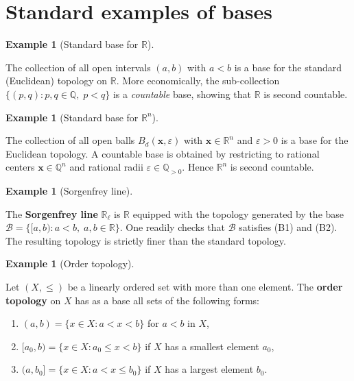 \documentclass[11pt,a4paper,twoside]{book}
\theoremstyle{remark}
\theoremstyle{definition}
\newtheorem{exampleplain}[theorem]{Example}
\theoremstyle{definition}
\newenvironment{example}[1][]{%
  \begin{exampleplain}[#1]\itshape
}{%
  \end{exampleplain}
}
\begin{document}
\section{Standard examples of bases}
\label{sec:base-examples}

\begin{example}[Standard base for $\mathbb{R}$]
\label{ex:base-R}
The collection of all open intervals $(a,b)$ with $a<b$ is a base for the
standard (Euclidean) topology on $\mathbb{R}$.  More economically, the
sub-collection $\{(p,q) : p,q\in\mathbb{Q},\;p<q\}$ is a \emph{countable}
base, showing that $\mathbb{R}$ is second countable.
\end{example}

\begin{example}[Standard base for $\mathbb{R}^n$]
\label{ex:base-Rn}
The collection of all open balls $B_d(\mathbf{x},\varepsilon)$ with
$\mathbf{x}\in\mathbb{R}^n$ and $\varepsilon>0$ is a base for the Euclidean
topology.  A countable base is obtained by restricting to rational centers
$\mathbf{x}\in\mathbb{Q}^n$ and rational radii $\varepsilon\in\mathbb{Q}_{>0}$.
Hence $\mathbb{R}^n$ is second countable.
\end{example}

\begin{example}[Sorgenfrey line]
\label{ex:sorgenfrey-base}
The \textbf{Sorgenfrey line} $\mathbb{R}_\ell$ is $\mathbb{R}$ equipped with
the topology generated by the base
$\mathscr{B}=\{[a,b) : a<b,\;a,b\in\mathbb{R}\}$.  One readily checks that
$\mathscr{B}$ satisfies (B1) and (B2).  The resulting topology is strictly
finer than the standard topology.
\end{example}

\begin{example}[Order topology]
\label{ex:order-topology-base}
Let $(X,\le)$ be a linearly ordered set with more than one element.  The
\textbf{order topology} on $X$ has as a base all sets of the following forms:
\begin{enumerate}
    \item $(a,b)=\{x\in X : a < x < b\}$ for $a<b$ in $X$,
    \item $[a_0,b)=\{x\in X : a_0\le x < b\}$ if $X$ has a smallest element
        $a_0$,
    \item $(a,b_0]=\{x\in X : a < x \le b_0\}$ if $X$ has a largest element
        $b_0$.
\end{enumerate}
\end{example}
\end{document}
